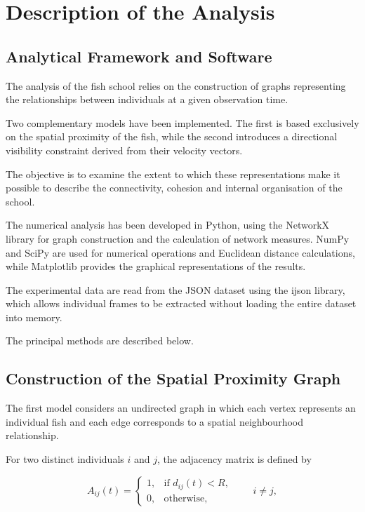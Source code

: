 \documentclass[10pt,a4paper]{article}
\begin{document}

\section{Description of the Analysis}

\subsection{Analytical Framework and Software}

The analysis of the fish school relies on the construction
of graphs representing the relationships between individuals
at a given observation time.

Two complementary models have been implemented. The first
is based exclusively on the spatial proximity of the fish,
while the second introduces a directional visibility
constraint derived from their velocity vectors.

The objective is to examine the extent to which these
representations make it possible to describe the
connectivity, cohesion and internal organisation of the
school.

The numerical analysis has been developed in Python,
using the NetworkX library for graph construction and
the calculation of network measures. NumPy and SciPy
are used for numerical operations and Euclidean distance
calculations, while Matplotlib provides the graphical
representations of the results.

The experimental data are read from the JSON dataset
using the ijson library, which allows individual frames
to be extracted without loading the entire dataset
into memory.

The principal methods are described below.

\subsection{Construction of the Spatial Proximity Graph}

The first model considers an undirected graph in which
each vertex represents an individual fish and each edge
corresponds to a spatial neighbourhood relationship.

For two distinct individuals $i$ and $j$, the adjacency
matrix is defined by

\begin{equation}
A_{ij}(t)=
\begin{cases}
1, & \text{if } d_{ij}(t)<R,\\
0, & \text{otherwise},
\end{cases}
\qquad i\neq j,
\end{equation}
\end{document}
